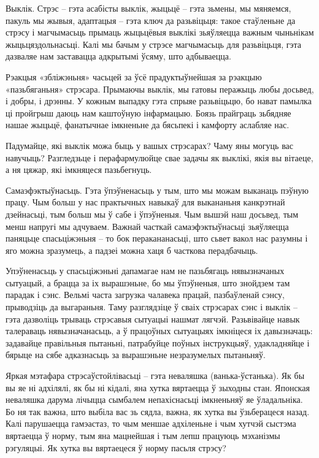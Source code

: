 Выклік. Стрэс – гэта асабісты выклік, жыцьцё – гэта зьмены, мы мяняемся, пакуль мы жывыя, адаптацыя – гэта ключ да разьвіцьця: такое стаўленьне да стрэсу і магчымасьць прымаць жыцьцёвыя выклікі зьяўляецца важным чыньнікам жыцьцяздольнасьці. Калі мы бачым у стрэсе магчымасьць для разьвіцьця, гэта дазваляе нам заставацца адкрытымі ўсяму, што адбываецца.

Рэакцыя «збліжэньня» часьцей за ўсё прадуктыўнейшая за рэакцыю «пазьбяганьня» стрэсара. Прымаючы выклік, мы гатовы перажыць любы досьвед, і добры, і дрэнны. У кожным выпадку гэта спрыяе разьвіцьцю, бо нават памылка ці пройгрыш даюць нам каштоўную інфармацыю. Боязь прайграць зьбядняе нашае жыцьцё, фанатычнае імкненьне да бясьпекі і камфорту аслабляе нас.

Падумайце, які выклік можа быць у вашых стрэсарах? Чаму яны могуць вас навучыць? Разгледзьце і перафармулюйце свае задачы як выклікі, якія вы вітаеце, а ня цяжар, які імкняцеся пазьбегнуць.

Самаэфэктыўнасьць. Гэта ўпэўненасьць у тым, што мы можам выканаць пэўную працу. Чым больш у нас практычных навыкаў для выкананьня канкрэтнай дзейнасьці, тым больш мы ў сабе і ўпэўненыя. Чым вышэй наш досьвед, тым менш напругі мы адчуваем. Важнай часткай самаэфэктыўнасьці зьяўляецца паняцьце спасьціжэньня – то бок перакананасьці, што сьвет вакол нас разумны і яго можна зразумець, а падзеі можна хаця б часткова перадбачыць. 

Упэўненасьць у спасьціжэньні дапамагае нам не пазьбягаць нявызначаных сытуацый, а брацца за іх вырашэньне, бо мы ўпэўненыя, што знойдзем там парадак і сэнс. Вельмі часта загрузка чалавека працай, пазбаўленай сэнсу, прыводзіць да выгараньня. Таму разглядзіце ў сваіх стрэсарах сэнс і выклік – гэта дазволіць трываць стрэсавыя сытуацыі нашмат лягчэй. Разьвівайце навык талераваць нявызначанасьць, а ў працоўных сытуацыях імкніцеся іх давызначаць: задавайце правільныя пытаньні, патрабуйце поўных інструкцыяў, удакладняйце і бярыце на сябе адказнасьць за вырашэньне незразумелых пытаньняў.

Яркая мэтафара стрэсаўстойлівасьці – гэта неваляшка (ванька-ўстанька). Як бы вы яе ні адхілялі, як бы ні кідалі, яна хутка вяртаецца ў зыходны стан. Японская неваляшка дарума лічыцца сымбалем непахіснасьці імкненьняў яе ўладальніка. Бо ня так важна, што выбіла вас зь сядла, важна, як хутка вы ўзьберацеся назад. Калі парушаецца гамэастаз, то чым меншае адхіленьне і чым хутчэй сыстэма вяртаецца ў норму, тым яна мацнейшая і тым лепш працуюць мэханізмы рэгуляцыі. Як хутка вы вяртаецеся ў норму пасьля стрэсу?

